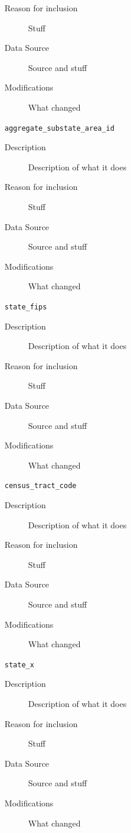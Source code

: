 \documentclass{article}
\begin{document}
\begin{itemize}[label={}, align=left]
\begin{description}
              \item[Reason for inclusion] Stuff
              \item[Data Source] Source and stuff
              \item[Modifications] What changed
          \end{description}
    \item[\texttt{aggregate\_substate\_area\_id}] \
          \begin{description}
              \item[Description] Description of what it does
              \item[Reason for inclusion] Stuff
              \item[Data Source] Source and stuff
              \item[Modifications] What changed
          \end{description}
    \item[\texttt{state\_fips}] \
          \begin{description}
              \item[Description] Description of what it does
              \item[Reason for inclusion] Stuff
              \item[Data Source] Source and stuff
              \item[Modifications] What changed
          \end{description}
    \item[\texttt{census\_tract\_code}] \
          \begin{description}
              \item[Description] Description of what it does
              \item[Reason for inclusion] Stuff
              \item[Data Source] Source and stuff
              \item[Modifications] What changed
          \end{description}
    \item[\texttt{state\_x}] \
          \begin{description}
              \item[Description] Description of what it does
              \item[Reason for inclusion] Stuff
              \item[Data Source] Source and stuff
              \item[Modifications] What changed

\end{description}
\end{itemize}
\end{document}
